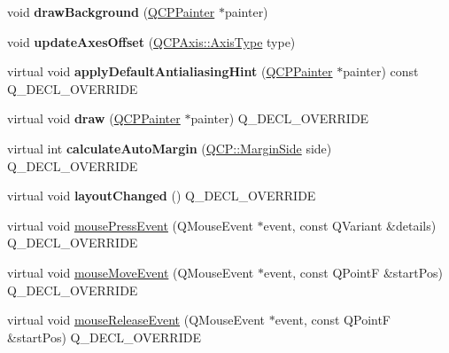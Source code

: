 \begin{DoxyCompactItemize}
\item 
\mbox{\label{class_q_c_p_axis_rect_ab49d338d1ce74b476fcead5b32cf06dc}} 
void {\bfseries draw\+Background} (\hyperlink{class_q_c_p_painter}{Q\+C\+P\+Painter} $\ast$painter)
\item 
\mbox{\label{class_q_c_p_axis_rect_a6024ccdc74f5dc0e8a0fe482e5b28a20}} 
void {\bfseries update\+Axes\+Offset} (\hyperlink{class_q_c_p_axis_ae2bcc1728b382f10f064612b368bc18a}{Q\+C\+P\+Axis\+::\+Axis\+Type} type)
\item 
\mbox{\label{class_q_c_p_axis_rect_a3b22bd6e457a8aa80862d8a1028176fd}} 
virtual void {\bfseries apply\+Default\+Antialiasing\+Hint} (\hyperlink{class_q_c_p_painter}{Q\+C\+P\+Painter} $\ast$painter) const Q\+\_\+\+D\+E\+C\+L\+\_\+\+O\+V\+E\+R\+R\+I\+DE
\item 
\mbox{\label{class_q_c_p_axis_rect_ab2b26ea1267ef842b20a05569577487b}} 
virtual void {\bfseries draw} (\hyperlink{class_q_c_p_painter}{Q\+C\+P\+Painter} $\ast$painter) Q\+\_\+\+D\+E\+C\+L\+\_\+\+O\+V\+E\+R\+R\+I\+DE
\item 
\mbox{\label{class_q_c_p_axis_rect_a986b1199b2827a5def15f986711b7c0e}} 
virtual int {\bfseries calculate\+Auto\+Margin} (\hyperlink{namespace_q_c_p_a7e487e3e2ccb62ab7771065bab7cae54}{Q\+C\+P\+::\+Margin\+Side} side) Q\+\_\+\+D\+E\+C\+L\+\_\+\+O\+V\+E\+R\+R\+I\+DE
\item 
\mbox{\label{class_q_c_p_axis_rect_a218b0d8e065b7eb5fc23c0d80e7d5f33}} 
virtual void {\bfseries layout\+Changed} () Q\+\_\+\+D\+E\+C\+L\+\_\+\+O\+V\+E\+R\+R\+I\+DE
\item 
virtual void \hyperlink{class_q_c_p_axis_rect_a8f514245839c0bfd9472e945899064e7}{mouse\+Press\+Event} (Q\+Mouse\+Event $\ast$event, const Q\+Variant \&details) Q\+\_\+\+D\+E\+C\+L\+\_\+\+O\+V\+E\+R\+R\+I\+DE
\item 
virtual void \hyperlink{class_q_c_p_axis_rect_a96e89068c5d9859f777d269fc277667a}{mouse\+Move\+Event} (Q\+Mouse\+Event $\ast$event, const Q\+PointF \&start\+Pos) Q\+\_\+\+D\+E\+C\+L\+\_\+\+O\+V\+E\+R\+R\+I\+DE
\item 
virtual void \hyperlink{class_q_c_p_axis_rect_ae4d536756ccd48928e8b3c475d8384b1}{mouse\+Release\+Event} (Q\+Mouse\+Event $\ast$event, const Q\+PointF \&start\+Pos) Q\+\_\+\+D\+E\+C\+L\+\_\+\+O\+V\+E\+R\+R\+I\+DE

\end{DoxyCompactItemize}
